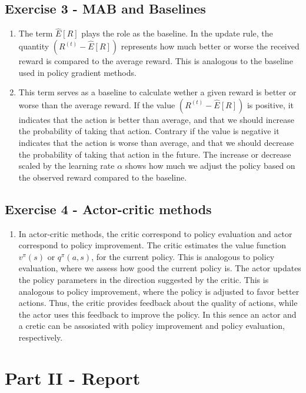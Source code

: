 \documentclass{article}
\begin{document}
\subsection*{Exercise 3 - MAB and Baselines}
\begin{enumerate}
    \item The term $\hat{E}[R]$ plays the role as the baseline.
    In the update rule, the quantity $(R^{(t)} - \hat{E}[R])$ represents how much better or worse the received reward is compared to the average reward.
    This is analogous to the baseline used in policy gradient methods.
    \item This term serves as a baseline to calculate wether a given reward is better or worse than the average reward. 
    If the value $(R^{(t)} - \hat{E}[R])$ is positive, it indicates that the action is better than average, and that we should increase the probability of taking that action. 
    Contrary if the value is negative it indicates that the action is worse than average, and that we should decrease the probability of taking that action in the future. 
    The increase or decrease scaled by the learning rate $\alpha$ shows how much we adjust the policy based on the observed reward compared to the baseline.
\end{enumerate}

\subsection*{Exercise 4 - Actor-critic methods}
\begin{enumerate}
    \item In actor-critic methods, the critic correspond to policy evaluation and actor correspond to policy improvement.
    The critic estimates the value function $v^\pi(s)$ or $q^\pi(a,s)$, for the current policy. This is analogous to policy evaluation, where we assess how good the current policy is.
    The actor updates the policy parameters in the direction suggested by the critic. This is analogous to policy improvement, where the policy is adjusted to favor better actions.
    Thus, the critic provides feedback about the quality of actions, while the actor uses this feedback to improve the policy.
    In this sence an actor and a cretic can be assosiated with policy improvement and policy evaluation, respectively.
\end{enumerate}

\section*{Part II - Report}
\end{document}
